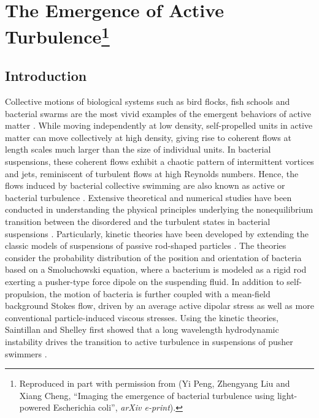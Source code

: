\chapter[The Emergence of Active Turbulence]{The Emergence of Active Turbulence\footnote[1]{
Reproduced in part with permission from (Yi Peng, Zhengyang Liu and Xiang Cheng, ``Imaging the emergence of bacterial turbulence using light-powered Escherichia coli'', \textit{arXiv e-print}).
}}
\label{the-emergence-of-active-turbulence}

\section{Introduction}
Collective motions of biological systems such as bird flocks, fish schools and bacterial swarms are the most vivid examples of the emergent behaviors of active matter \cite{Marchetti2013}. While moving independently at low density, self-propelled units in active matter can move collectively at high density, giving rise to coherent flows at length scales much larger than the size of individual units. In bacterial suspensions, these coherent flows exhibit a chaotic pattern of intermittent vortices and jets, reminiscent of turbulent flows at high Reynolds numbers. Hence, the flows induced by bacterial collective swimming are also known as active or bacterial turbulence \cite{Wolgemuth2008, Wensink2012, Linkmann2019, Dunkel2013}.
Extensive theoretical and numerical studies have been conducted in understanding the physical principles underlying the nonequilibrium transition between the disordered and the turbulent states in bacterial suspensions \cite{Marchetti2013, Ramaswamy2010, Koch2011, Saintillan2015}.
Particularly, kinetic theories have been developed by extending the classic models of suspensions of passive rod-shaped particles \cite{Koch2011, Saintillan2015, Stenhammar2017}. The theories consider the probability distribution of the position and orientation of bacteria based on a Smoluchowski equation, where a bacterium is modeled as a rigid rod exerting a pusher-type force dipole on the suspending fluid. In addition to self-propulsion, the motion of bacteria is further coupled with a mean-field background Stokes flow, driven by an average active dipolar stress as well as more conventional particle-induced viscous stresses.
Using the kinetic theories, Saintillan and Shelley first showed that a long wavelength hydrodynamic instability drives the transition to active turbulence in suspensions of pusher swimmers \cite{Saintillan2015, Saintillan2008a, Saintillan2008b, Hohenegger2010}.

